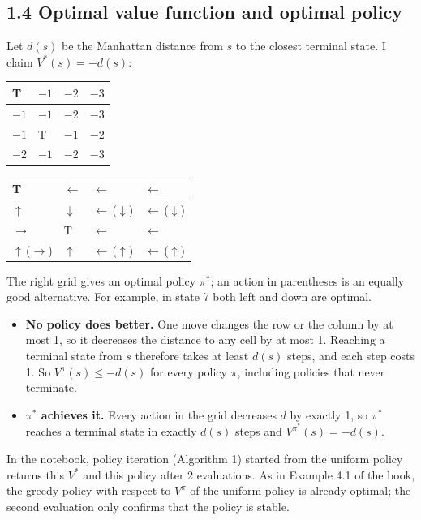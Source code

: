 \documentclass[letterpaper, 11pt]{article}
\newcommand{\1}{\mathds{1}}	%
\theoremstyle{definition}
\newcommand{\T}{\cellcolor[gray]{0.85}T}
\begin{document}
\subsection*{1.4 Optimal value function and optimal policy}

Let $d(s)$ be the Manhattan distance from $s$ to the closest terminal state. I claim $V^*(s) = -d(s)$:
\begin{center}
\renewcommand{\arraystretch}{1.3}
\begin{tabular}{|G|G|G|G|}
\hline
\T & $-1$ & $-2$ & $-3$ \\ \hline
$-1$ & $-1$ & $-2$ & $-3$ \\ \hline
$-1$ & \T & $-1$ & $-2$ \\ \hline
$-2$ & $-1$ & $-2$ & $-3$ \\ \hline
\end{tabular}
\qquad
\begin{tabular}{|G|G|G|G|}
\hline
\T & $\leftarrow$ & $\leftarrow$ & $\leftarrow$ \\ \hline
$\uparrow$ & $\downarrow$ & $\leftarrow$\,($\downarrow$) & $\leftarrow$\,($\downarrow$) \\ \hline
$\rightarrow$ & \T & $\leftarrow$ & $\leftarrow$ \\ \hline
$\uparrow$\,($\rightarrow$) & $\uparrow$ & $\leftarrow$\,($\uparrow$) & $\leftarrow$\,($\uparrow$) \\ \hline
\end{tabular}
\end{center}
The right grid gives an optimal policy $\pi^*$; an action in parentheses is an equally good alternative. For example, in state 7 both left and down are optimal.

\begin{itemize}
  \item \textbf{No policy does better.} One move changes the row or the column by at most 1, so it decreases the distance to any cell by at most 1. Reaching a terminal state from $s$ therefore takes at least $d(s)$ steps, and each step costs 1. So $V^\pi(s) \le -d(s)$ for every policy $\pi$, including policies that never terminate.
  \item \textbf{$\pi^*$ achieves it.} Every action in the grid decreases $d$ by exactly 1, so $\pi^*$ reaches a terminal state in exactly $d(s)$ steps and $V^{\pi^*}(s) = -d(s)$.
\end{itemize}
In the notebook, policy iteration (Algorithm 1) started from the uniform policy returns this $V^*$ and this policy after 2 evaluations. As in Example 4.1 of the book, the greedy policy with respect to $V^\pi$ of the uniform policy is already optimal; the second evaluation only confirms that the policy is stable.
\end{document}
